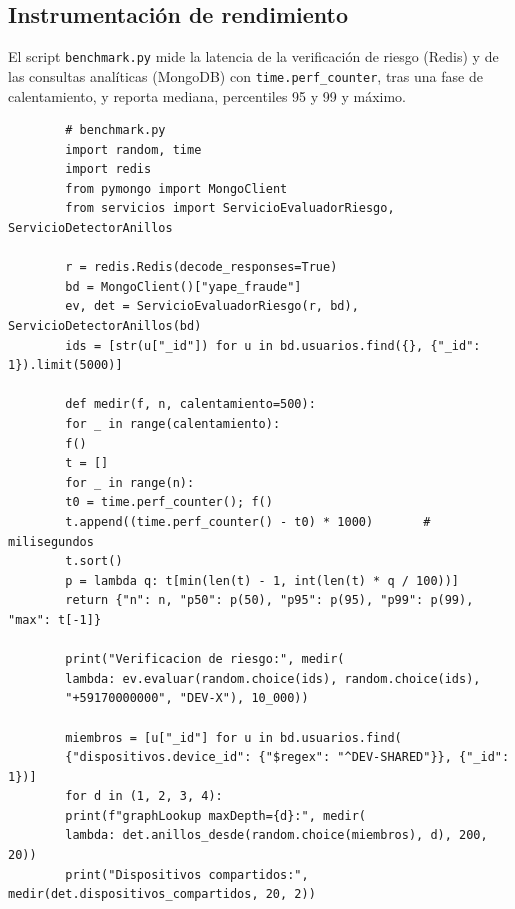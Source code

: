 \documentclass[11pt,a4paper]{article}
\begin{document}
	\subsection{Instrumentación de rendimiento}
	El script \texttt{benchmark.py} mide la latencia de la verificación de riesgo (Redis) y de las consultas analíticas (MongoDB) con \texttt{time.perf\_counter}, tras una fase de calentamiento, y reporta mediana, percentiles 95 y 99 y máximo.
	\begin{lstlisting}
		# benchmark.py
		import random, time
		import redis
		from pymongo import MongoClient
		from servicios import ServicioEvaluadorRiesgo, ServicioDetectorAnillos
		
		r = redis.Redis(decode_responses=True)
		bd = MongoClient()["yape_fraude"]
		ev, det = ServicioEvaluadorRiesgo(r, bd), ServicioDetectorAnillos(bd)
		ids = [str(u["_id"]) for u in bd.usuarios.find({}, {"_id": 1}).limit(5000)]
		
		def medir(f, n, calentamiento=500):
		for _ in range(calentamiento):
		f()
		t = []
		for _ in range(n):
		t0 = time.perf_counter(); f()
		t.append((time.perf_counter() - t0) * 1000)       # milisegundos
		t.sort()
		p = lambda q: t[min(len(t) - 1, int(len(t) * q / 100))]
		return {"n": n, "p50": p(50), "p95": p(95), "p99": p(99), "max": t[-1]}
		
		print("Verificacion de riesgo:", medir(
		lambda: ev.evaluar(random.choice(ids), random.choice(ids),
		"+59170000000", "DEV-X"), 10_000))
		
		miembros = [u["_id"] for u in bd.usuarios.find(
		{"dispositivos.device_id": {"$regex": "^DEV-SHARED"}}, {"_id": 1})]
		for d in (1, 2, 3, 4):
		print(f"graphLookup maxDepth={d}:", medir(
		lambda: det.anillos_desde(random.choice(miembros), d), 200, 20))
		print("Dispositivos compartidos:", medir(det.dispositivos_compartidos, 20, 2))
	\end{lstlisting}
	
\end{document}
